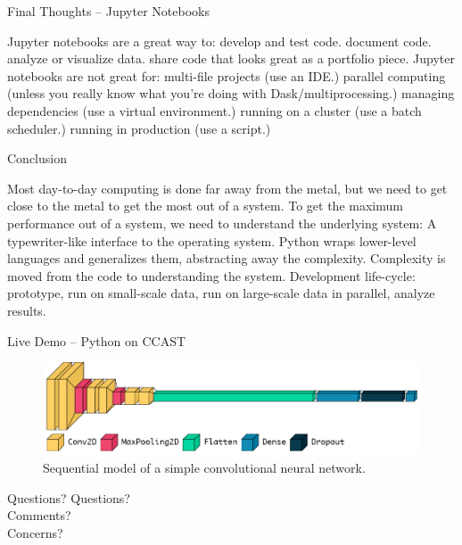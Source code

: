 \documentclass[aspectratio=169]{beamer}
\begin{document}
    \begin{frame}{Final Thoughts -- Jupyter Notebooks}
        \begin{outline}
            \1 Jupyter notebooks are a great way to:
                \2 develop and test code.
                \2 document code.
                \2 analyze or visualize data.
                \2 share code that looks great as a portfolio piece.
            \1 Jupyter notebooks are not great for: 
                \2 multi-file projects (use an IDE.)
                \2 parallel computing (unless you really know what you're doing with Dask/multiprocessing.)
                \2 managing dependencies (use a virtual environment.)
                \2 running on a cluster (use a batch scheduler.)
                \2 running in production (use a script.)
        \end{outline}
    \end{frame}

    \begin{frame}{Conclusion}
        \begin{outline}
            \1 Most day-to-day computing is done far away from the metal, but we need to get close to the metal to get the most out of a system.
            \1 To get the maximum performance out of a system, we need to understand the underlying system:
                \2 A typewriter-like interface to the operating system.
            \1 Python wraps lower-level languages and generalizes them, abstracting away the complexity.
                \2 Complexity is moved from the code to understanding the system.
            \1 Development life-cycle: prototype, run on small-scale data, run on large-scale data in parallel, analyze results.
        \end{outline}
    \end{frame}

    \begin{frame}{Live Demo -- Python on CCAST}
        \begin{figure}[H]
            \centering
            \includegraphics[width=\linewidth]{sequential_model.png}
            \caption{Sequential model of a simple convolutional neural network.}
        \end{figure}
    \end{frame}

    \begin{frame}{Questions?}
        \centering
    \Huge{Questions?}\\ 
    \Huge{Comments?} \\ 
    \Huge{Concerns?}
    \end{frame}
\end{document}
